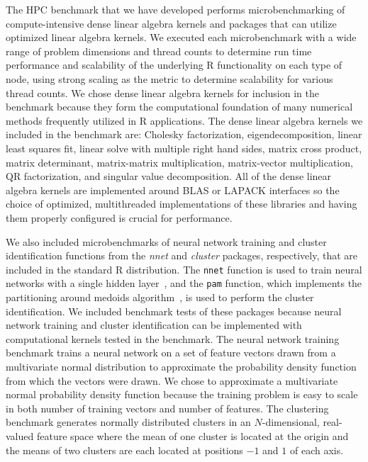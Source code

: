 The HPC benchmark that we have developed performs microbenchmarking of compute-intensive
dense linear algebra kernels and packages that can utilize optimized linear algebra
kernels. We executed each microbenchmark with a wide range of problem dimensions and
thread counts to determine run time performance and scalability of the underlying R
functionality on each type of node, using strong scaling as the metric to determine
scalability for various thread counts. We chose dense linear algebra kernels for inclusion
in the benchmark because they form the computational foundation of many numerical methods
frequently utilized in R applications. The dense linear algebra kernels we included in the
benchmark are: Cholesky factorization, eigendecomposition, linear least squares fit,
linear solve with multiple right hand sides, matrix cross product, matrix determinant,
matrix-matrix multiplication, matrix-vector multiplication, QR factorization, and singular
value decomposition. All of the dense linear algebra kernels are implemented around BLAS
or LAPACK interfaces so the choice of optimized, multithreaded implementations of these
libraries and having them properly configured is crucial for performance.

We also included microbenchmarks of neural network training and cluster identification
functions from the \textit{nnet} and \textit{cluster} packages, respectively, that are
included in the standard R distribution. The \texttt{nnet} function is used to train
neural networks with a single hidden layer~\cite{ripley:pattern96}, and the \texttt{pam}
function, which implements the partitioning around medoids algorithm~\cite{chu:kmedoids,
reynolds:clustering}, is used to perform the cluster identification. We included benchmark
tests of these packages because neural network training and cluster identification can be
implemented with computational kernels tested in the benchmark. The neural network
training benchmark trains a neural network on a set of feature vectors drawn from a
multivariate normal distribution to approximate the probability density function from
which the vectors were drawn. We chose to approximate a multivariate normal probability
density function because the training problem is easy to scale in both number of training
vectors and number of features. The clustering benchmark generates normally distributed
clusters in an $N$-dimensional, real-valued feature space where the mean of one cluster is
located at the origin and the means of two clusters are each located at positions $-1$ and
$1$ of each axis.

